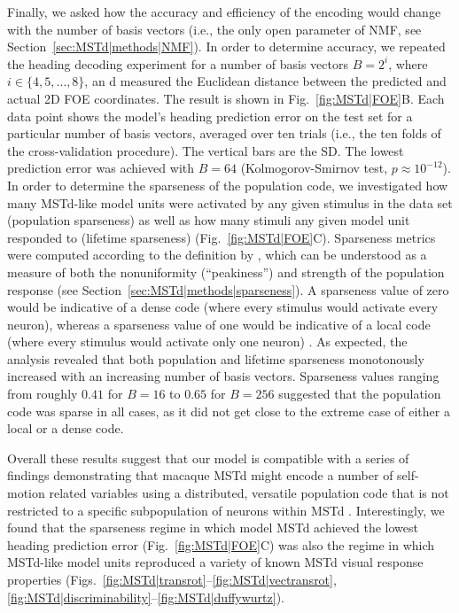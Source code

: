 Finally, we asked how the accuracy and efficiency of the encoding would 
change with the number of basis vectors (i.e., the only open parameter of 
\ac{NMF}, see Section~\ref{sec:MSTd|methods|NMF}). 
In order to determine accuracy, we repeated the heading decoding experiment 
for a number of basis vectors $B=2^i$, where $i \in \{4, 5, \ldots, 8\}$, an
d measured the Euclidean distance between the predicted and actual 2D 
\ac{FOE} coordinates. The result is shown in Fig.~\ref{fig:MSTd|FOE}B. 
Each data point shows the model's heading prediction error on the test set 
for a particular number of basis vectors, averaged over ten trials (i.e., the
ten folds of the cross-validation procedure). The vertical bars are the SD. 
The lowest prediction error was achieved with $B=64$ (Kolmogorov-Smirnov 
test, $p \approx 10^{-12}$). In order to determine the sparseness of the 
population code, we investigated how many \ac{MSTd}-like model units were
activated by any given stimulus in the data set (population sparseness) as 
well as how many stimuli any given model unit responded to (lifetime 
sparseness) (Fig.~\ref{fig:MSTd|FOE}C). Sparseness metrics were computed 
according to the definition by \cite{VinjeGallant2000}, which can be 
understood as a measure of both the nonuniformity (``peakiness'') and 
strength of the population response (see 
Section~\ref{sec:MSTd|methods|sparseness}). A sparseness value of zero 
would be indicative of a dense code (where every stimulus would activate 
every neuron), whereas a sparseness value of one would be indicative of a 
local code (where every stimulus would activate only one neuron) 
\citep{SpanneJorntell2015}. As expected, the analysis revealed that both
population and lifetime sparseness monotonously increased with an increasing 
number of basis vectors. Sparseness values ranging from roughly $0.41$ for
$B=16$ to $0.65$ for $B=256$ suggested that the population code was sparse
in all cases, as it did not get close to the extreme case of either a local 
or a dense code.

Overall these results suggest that our model is compatible with a series of
findings demonstrating that macaque MSTd might encode a number of self-motion
related variables using a distributed, versatile population code that is not
restricted to a specific subpopulation of neurons within \ac{MSTd}
\citep{Bremmer1998,BenHamed2003,Gu2010,Xu2014}.
Interestingly, we found that the sparseness regime in which model \ac{MSTd}
achieved the lowest heading prediction error (Fig.~\ref{fig:MSTd|FOE}C) was 
also the regime in which \ac{MSTd}-like model units reproduced a variety of 
known \ac{MSTd} visual response properties 
(Figs.~\ref{fig:MSTd|transrot}--\ref{fig:MSTd|vectransrot},
\ref{fig:MSTd|discriminability}--\ref{fig:MSTd|duffywurtz}).


